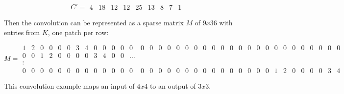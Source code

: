 $$
C' =
\begin{matrix}
  4 & 18 & 12 & 12 & 25 & 13 & 8 & 7 & 1
\end{matrix}
$$

Then the convolution can be represented as a sparse matrix $M$ of $9x36$ with entries from $K$, one patch
per row:

$$
M =
\begin{matrix}
  1 & 2 & 0 & 0 & 0 & 0 & 3 & 4 & 0 & 0 & 0 & 0 & 0 & 0 & 0 & 0 & 0 & 0 & 0 & 0 & 0 & 0 & 0 & 0 & 0 & 0 & 0 & 0 & 0 & 0 & 0 & 0 & 0 & 0 & 0 & 0 \\
  0 & 0 & 1 & 2 & 0 & 0 & 0 & 0 & 3 & 4 & 0 & 0 & \dots \\
  \vdots \\
  0 & 0 & 0 & 0 & 0 & 0 & 0 & 0 & 0 & 0 & 0 & 0 & 0 & 0 & 0 & 0 & 0 & 0 & 0 & 0 & 0 & 0 & 0 & 0 & 0 & 0 & 0 & 0 & 1 & 2 & 0 & 0 & 0 & 0 & 3 & 4
\end{matrix}
$$

This convolution example maps an input of $4x4$ to an output of $3x3$. 

\clearpage %
